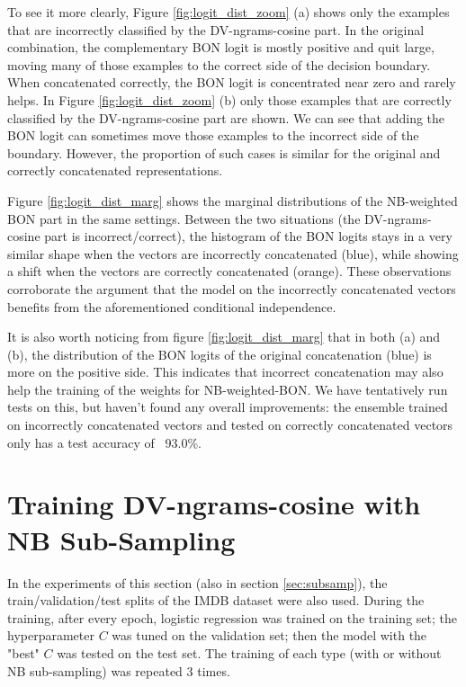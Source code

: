 \documentclass[11pt]{article}
\begin{document}
To see it more clearly, Figure \ref{fig:logit_dist_zoom} (a) shows only the examples that are incorrectly classified by the DV-ngrams-cosine part. In the original combination, the complementary BON logit is mostly positive and quit large, moving many of those examples to the correct side of the decision boundary. When concatenated correctly, the BON logit is concentrated near zero and rarely helps. In Figure \ref{fig:logit_dist_zoom} (b) only those examples that are correctly classified by the DV-ngrams-cosine part are shown. We can see that adding the BON logit can sometimes move those examples to the incorrect side of the boundary. However, the proportion of such cases is similar for the original and correctly concatenated representations.

Figure \ref{fig:logit_dist_marg} shows the marginal distributions of the NB-weighted BON part in the same settings. Between the two situations (the DV-ngrams-cosine part is incorrect/correct), the histogram of the BON logits stays in a very similar shape when the vectors are incorrectly concatenated (blue), while showing a shift when the vectors are correctly concatenated (orange). These observations corroborate the argument that the model on the incorrectly concatenated vectors benefits from the aforementioned conditional independence.

It is also worth noticing from figure \ref{fig:logit_dist_marg} that in both (a) and (b), the distribution of the BON logits of the original concatenation (blue) is more on the positive side. This indicates that incorrect concatenation may also help the training of the weights for NB-weighted-BON. We have tentatively run tests on this, but haven't found any overall improvements: the ensemble trained on incorrectly concatenated vectors and tested on correctly concatenated vectors only has a test accuracy of ~93.0\%.

\section{Training DV-ngrams-cosine with NB Sub-Sampling}
\label{sec_appendix_subsamp}
In the experiments of this section (also in section \ref{sec:subsamp}), the train/validation/test splits \citep{suchin2020} of the IMDB dataset were also used. During the training, after every epoch, logistic regression was trained on the training set; the hyperparameter $C$ was tuned on the validation set; then the model with the "best" $C$ was tested on the test set. The training of each type (with or without NB sub-sampling) was repeated 3 times.\newline
\end{document}
